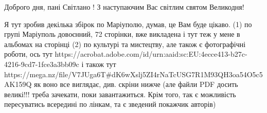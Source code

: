  
 
 
 
 

Доброго дня, пані Світлано ! З наступаючим Вас світлим святом Великодня!

Я тут зробив декілька збірок по Маріуполю, думав, це Вам буде цікаво. (1) по
групі Маріуполь довоєнний, 72 сторінки, вже викладена і тут теж у мене в
альбомах на сторінці (2) по культурі та мистецтву, але також є фотографічні
роботи, ось тут
https://acrobat.adobe.com/id/urn:aaid:sc:EU:4ecce413-b27c-4216-9cd7-1fce3a3bb09c
і також тут
https://mega.nz/file/V7JUga6T#dK6wXslj5ZI4rNaTcUSG7R1M93QH3oa54O5c5AK159Q як
воно все виглядає, див. скріни нижче (але файли PDF досить великі!!! треба зачекати,
поки завантажиться. Крім того, так є можливість пересуватись всередині по
лінкам, та є зведений покажчик авторів)
